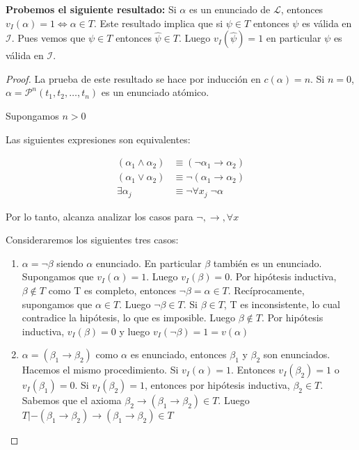 \textbf{Probemos el siguiente resultado:} Si $\alpha$ es un enunciado de $\mathcal{L}$, entonces $v_{I}(\alpha) = 1 \iff \alpha \in T$. Este resultado implica que si $\psi \in T$ entonces $\psi$ es v\'alida en $\mathcal{I}$. Pues vemos que $\psi \in T$ entonces $\hat{\psi} \in T$. Luego $v_{I}(\hat{\psi}) = 1$ en particular $\psi$ es v\'alida en $\mathcal{I}$.

\begin{proof}
La prueba de este resultado se hace por inducci\'on en $c(\alpha) = n$. Si $n = 0$, $\alpha = \mathcal{P}^{n}(t_1, t_2, \ldots, t_n)$ es un enunciado at\'omico.

Supongamos $n > 0$

\begin{observation}
Las siguientes expresiones son equivalentes:

\begin{align*}
    (\alpha_1 \land \alpha_2)     &\equiv (\neg \alpha_1 \rightarrow \alpha_2)    \\
    (\alpha_1 \lor \alpha_2)     &\equiv \neg(\alpha_1 \rightarrow \alpha_2)    \\
    \exists \alpha_j \;             &\equiv \neg \forall x_j \; \neg \alpha        
\end{align*}

Por lo tanto, alcanza analizar los casos para $\neg, \rightarrow, \forall x$
\end{observation}


Consideraremos los siguientes tres casos:

\begin{enumerate}
    \item $\alpha = \neg \beta$ siendo $\alpha$ enunciado. En particular $\beta$ tambi\'en es un enunciado. Supongamos que $v_{I}(\alpha) = 1$. Luego $v_{I}(\beta) = 0$. Por hip\'otesis inductiva, $\beta \notin T$ como T es completo, entonces $\neg \beta = \alpha \in T$. Rec\'iprocamente, supongamos que $\alpha \in T$. Luego $\neg \beta \in T$. Si $\beta \in T$, T es inconsistente, lo cual contradice la hip\'otesis, lo que es imposible. Luego $\beta \notin T$. Por hip\'otesis inductiva, $v_{I}(\beta) = 0$ y luego $v_{I}(\neg \beta) = 1 = v(\alpha)$
    \item $\alpha = (\beta_1 \rightarrow \beta_2)$ como $\alpha$ es enunciado, entonces $\beta_1$ y $\beta_2$ son enunciados. Hacemos el mismo procedimiento. Si $v_{I}(\alpha) = 1$. Entonces $v_{I}(\beta_2) = 1$ o $v_{I}(\beta_1) = 0$. Si $v_{I}(\beta_2) = 1$, entonces por hip\'otesis inductiva, $\beta_2 \in T$. Sabemos que el axioma $\beta_2 \rightarrow (\beta_1 \rightarrow \beta_2) \in T$. Luego $T |- (\beta_1 \rightarrow \beta_2) \rightarrow (\beta_1 \rightarrow \beta_2) \in T$


\end{enumerate}
\end{proof}
